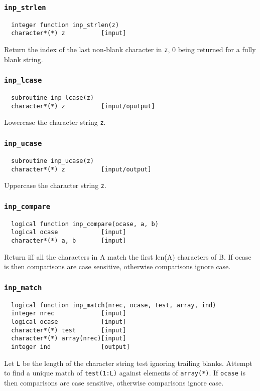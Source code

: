 \subsubsection{{\tt inp\_strlen}}
\begin{verbatim}
  integer function inp_strlen(z)
  character*(*) z          [input]
\end{verbatim}
Return the index of the last non-blank character in {\tt z}, 0 being
returned for a fully blank string.

\subsubsection{{\tt inp\_lcase}}
\begin{verbatim}
  subroutine inp_lcase(z)
  character*(*) z          [input/oputput]
\end{verbatim}
Lowercase the character string {\tt z}.

\subsubsection{{\tt inp\_ucase}}
\begin{verbatim}
  subroutine inp_ucase(z)
  character*(*) z          [input/output]
\end{verbatim}
Uppercase the character string {\tt z}.

\subsubsection{{\tt inp\_compare}}
\begin{verbatim}
  logical function inp_compare(ocase, a, b)
  logical ocase            [input]
  character*(*) a, b       [input]
\end{verbatim}
Return \TRUE iff all the characters in A match the first len(A)
characters of B.  If ocase is \TRUE then comparisons are case
sensitive, otherwise comparisons ignore case.

\subsubsection{{\tt inp\_match}}
\begin{verbatim}
  logical function inp_match(nrec, ocase, test, array, ind)
  integer nrec             [input]
  logical ocase            [input]
  character*(*) test       [input]
  character*(*) array(nrec)[input]
  integer ind              [output]
\end{verbatim}
Let {\tt L} be the length of the character string test ignoring
trailing blanks.  Attempt to find a unique match of \verb+test(1:L)+
against elements of \verb+array(*)+.  If \verb+ocase+ is \TRUE then
comparisons are case sensitive, otherwise comparisons ignore case.


